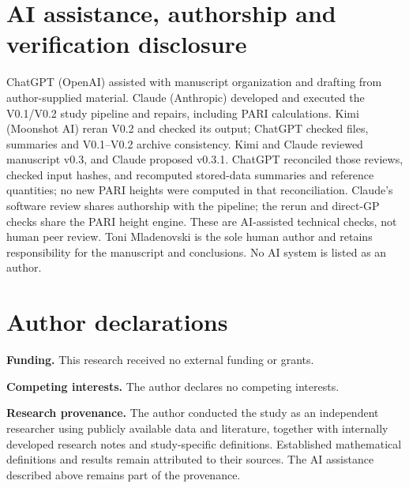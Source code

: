 \documentclass[11pt,a4paper]{article}
\begin{document}
\section*{AI assistance, authorship and verification disclosure}
ChatGPT (OpenAI) assisted with manuscript organization and drafting from author-supplied material. Claude (Anthropic) developed and executed the V0.1/V0.2 study pipeline and repairs, including PARI calculations. Kimi (Moonshot AI) reran V0.2 and checked its output; ChatGPT checked files, summaries and V0.1--V0.2 archive consistency. Kimi and Claude reviewed manuscript v0.3, and Claude proposed v0.3.1. ChatGPT reconciled those reviews, checked input hashes, and recomputed stored-data summaries and reference quantities; no new PARI heights were computed in that reconciliation. Claude's software review shares authorship with the pipeline; the rerun and direct-GP checks share the PARI height engine. These are AI-assisted technical checks, not human peer review. Toni Mladenovski is the sole human author and retains responsibility for the manuscript and conclusions. No AI system is listed as an author.

\section*{Author declarations}
\noindent\textbf{Funding.} This research received no external funding or grants.

\noindent\textbf{Competing interests.} The author declares no competing interests.

\noindent\textbf{Research provenance.} The author conducted the study as an independent researcher using publicly available data and literature, together with internally developed research notes and study-specific definitions. Established mathematical definitions and results remain attributed to their sources. The AI assistance described above remains part of the provenance.
\end{document}
